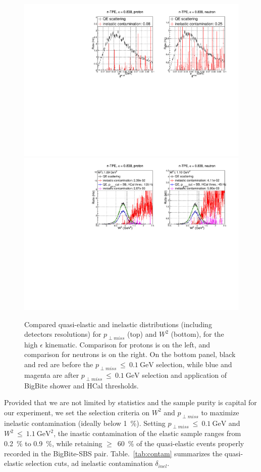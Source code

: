 \begin{figure}[h]
  \centering
    \includegraphics[width=12cm]{Plots/gen-tpe_he_pperp_acc.pdf}
    \includegraphics[width=12cm]{Plots/gen-tpe_he_W2_acc.pdf}
    \caption{Compared quasi-elastic and inelastic distributions (including detectors resolutions) for $p_{\perp miss}$ (top) and $W^2$ (bottom), for the high $\epsilon$ kinematic. Comparison for protons is on the left, and comparison for neutrons is on the right. On the bottom panel, black and red are before the $p_{\perp miss}~\leq~0.1~\mathrm{GeV}$ selection, while blue and magenta are after $p_{\perp miss}~\leq~0.1~\mathrm{GeV}$ selection and application of BigBite shower and HCal thresholds.}
    \label{fig:inel_contam_he}
\end{figure}

Provided that we are not limited by statistics and the sample purity is capital for our experiment, we set the selection criteria on $W^2$ and $p_{\perp miss}$ to maximize inelastic contamination (ideally below 1~\%). 
Setting $p_{\perp miss}~\leq~0.1~\mathrm{GeV}$ and $W^2~\leq~1.1~\mathrm{GeV}^2$, the inastic contamination of the elastic sample ranges from 0.2~\% to 0.9~\%, while retaining $\geq$~60~\% of the quasi-elastic events properly recorded in the BigBite-SBS pair.
Table.~\ref{tab:contam} summarizes the quasi-elastic selection cuts, ad inelastic contamination $\delta_{inel}$.

